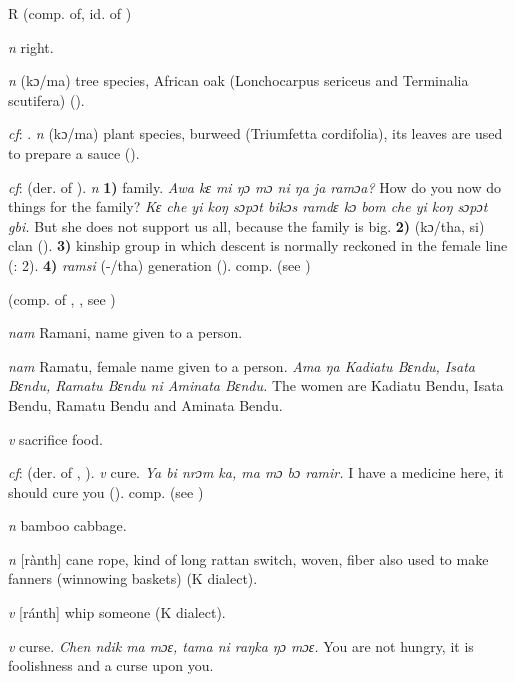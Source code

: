 \begin{letter}{R}
 (comp. of, id. of ) 

 \textit{n} right.

 \textit{n} (kɔ/ma) tree species, African oak (Lonchocarpus sericeus and Terminalia scutifera) (\citealt{Pichl1967}). 

 \textit{cf}: . \textit{n} (kɔ/ma) plant species, burweed (Triumfetta cordifolia), its leaves are used to prepare a sauce (\citealt{Pichl1967}). 

 \textit{cf}:  (der. of ). \textit{n} \textbf{1)} family. \textit{Awa kɛ mi ŋɔ mɔ ni ŋa ja ramɔa?} How do you now do things for the family? \textit{Kɛ che yi koŋ sɔpɔt bikɔs ramdɛ kɔ bom che yi koŋ sɔpɔt gbi.} But she does not support us all, because the family is big. \textbf{2)} (kɔ/tha, si) clan (\citealt{Pichl1967}). \textbf{3)} kinship group in which descent is normally reckoned in the female line (\citealt{Hall1938}: 2). \textbf{4)} \textit{ramsi} (-/tha) generation (\citealt{Pichl1967}). comp.  (see ) 

 (comp. of , , see ) 

 \textit{nam} Ramani, name given to a person.

 \textit{nam} Ramatu, female name given to a person. \textit{Ama ŋa Kadiatu Bɛndu, Isata Bɛndu, Ramatu Bɛndu ni Aminata Bɛndu.} The women are Kadiatu Bendu, Isata Bendu, Ramatu Bendu and Aminata Bendu.

 \textit{v} sacrifice food.

 \textit{cf}:  (der. of , ). \textit{v} cure. \textit{Ya bi nrɔm ka, ma mɔ bɔ ramir.} I have a medicine here, it should cure you (\citealt{Pichl1967}). comp.  (see ) 

 \textit{n} bamboo cabbage.

 \textit{n} [rànth] cane rope, kind of long rattan switch, woven, fiber also used to make fanners (winnowing baskets) (K dialect). 

 \textit{v} [ránth] whip someone (K dialect). 

 \textit{v} curse. \textit{Chen ndik ma mɔɛ, tama ni raŋka ŋɔ mɔɛ.} You are not hungry, it is foolishness and a curse upon you.


\end{letter}
